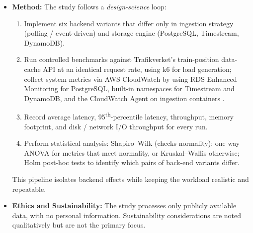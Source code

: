 \documentclass[11pt]{article}
\begin{document}
\begin{itemize}[leftmargin=*, label={}]

    \item \textbf{Method:}  
      The study follows a \emph{design-science} loop:

      \begin{enumerate}[label=\arabic*.]
        \item Implement six backend variants that differ only in ingestion strategy (polling / event-driven) and storage engine (PostgreSQL, Timestream, DynamoDB).
        \item Run controlled benchmarks against Trafikverket’s train-position data-cache API at an identical request rate, using k6 \cite{k6Docs2025} for load generation; collect system metrics via AWS CloudWatch by using RDS Enhanced Monitoring for PostgreSQL, built-in namespaces for Timestream and DynamoDB, and the CloudWatch Agent on ingestion containers \cite{AWSCloudWatch2025}.
        \item Record average latency, 95\textsuperscript{th}-percentile latency, throughput, memory footprint, and disk / network I/O throughput for every run.
        \item Perform statistical analysis: Shapiro--Wilk (checks normality); one-way ANOVA \cite{StatsDirectANOVA2023} for metrics that meet normality, or Kruskal--Wallis \cite{StatsDirectKW2023} otherwise; Holm post-hoc tests to identify which pairs of back-end variants differ.

      \end{enumerate}

      This pipeline isolates backend effects while keeping the workload realistic and repeatable.

  

  \item \textbf{Ethics and Sustainability:} The study processes only publicly available data, with no personal information. Sustainability considerations are noted qualitatively but are not the primary focus.
  


\end{itemize}
\end{document}
